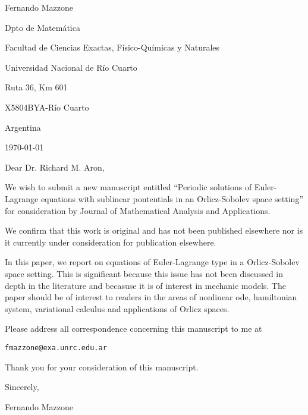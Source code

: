 \documentclass{article}
\begin{document}
\begin{flushright}
Fernando Mazzone

Dpto de Matem\'atica

Facultad de Ciencias Exactas, F\'isico-Qu\'imicas y Naturales

Universidad Nacional de R\'io Cuarto

Ruta 36, Km 601

X5804BYA-R\'io Cuarto

Argentina
\end{flushright}

\today
\vspace{1cm}

Dear Dr. Richard M. Aron,
\vspace{.5cm}

We wish to submit a new manuscript entitled ``Periodic solutions of
Euler-Lagrange equations with sublinear pontentials   in an Orlicz-Sobolev space setting'' for consideration by  Journal of Mathematical Analysis and Applications.

We confirm that this work is original and has not been published elsewhere nor is it currently under consideration for publication elsewhere.

In this paper, we report on equations of Euler-Lagrange type in a Orlicz-Sobolev space setting. This is significant because this issue has not been discussed in depth in the literature and becasuse it is of interest in mechanic models.  The paper should be of interest to readers in the areas of nonlinear ode, hamiltonian system, variational calculus and applications of Orlicz spaces.

Please address all correspondence concerning this manuscript to me at 

\texttt{fmazzone@exa.unrc.edu.ar}

Thank you for your consideration of this manuscript. 

Sincerely,
\vspace{.5cm}

Fernando Mazzone
\end{document}

